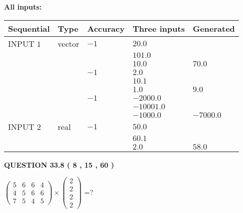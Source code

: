 \documentclass[12pt]{article}
\begin{document}
   
   
   
\noindent\vspace{0.1in}\hspace{-0.08in} {\textbf{\Large{All inputs: }}}
   
   
  
  
\noindent\begin{tabular}{|l|l|l|l|l|}
\hline
 Sequential & Type & Accuracy & Three inputs & Generated \\ 
\hline
 
 
  INPUT $            1 $ & vector & $           -1  $ & $
20.0
  $ & \\
  & & & $
101.0
  $ & \\
  & & & $
10.0
$ & $ 70.0 $ 
  \\
  & & $           -1  $ & $
2.0
  $ & \\
  & & & $
10.1
  $ & \\
  & & & $
1.0
$ & $ 9.0 $ 
  \\
  & & $           -1  $ & $
-2000.0
  $ & \\
  & & & $
-10001.0
  $ & \\
  & & & $
-1000.0
$ & $ -7000.0 $ 
 \\  \hline  
 
 
  INPUT $            2 $ & real & $           -1  $ & $
 50.0
  $ & \\
  & & &  $
 60.1
  $ & \\
  & & &  $
 2.0
 $ & $ 58.0 $ 
 \\  \hline  
 \end{tabular}
   
   
  
\vspace{0.2in}
  
{\textbf{\Large{QUESTION
33.8 
 (           8 ,          15 ,          60 )
}}}
  
  
 
$ \left( \begin{array}{ccccccccc}
           5  & 
           6  & 
           6  & 
           4  \\ 
           4  & 
           5  & 
           6  & 
           6  \\ 
           7  & 
           5  & 
           4  & 
           5
\end{array}\right) \times
\left( \begin{array}{c}
           2  \\ 
           2  \\ 
           2  \\ 
           2
\end{array}\right) $ =?
 
\end{document}
